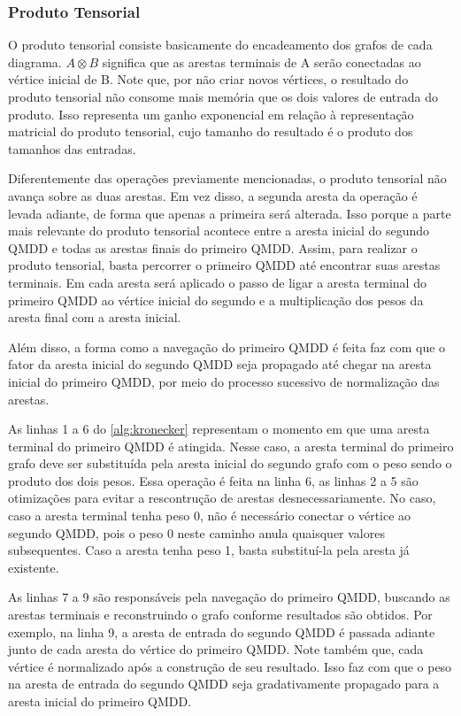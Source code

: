 \subsubsection{Produto Tensorial}\label{subsub:kronecker}

O produto tensorial consiste basicamente do encadeamento dos grafos de cada diagrama. $A \otimes B$ significa que as arestas terminais de A serão conectadas ao vértice inicial de B. Note que, por não criar novos vértices, o resultado do produto tensorial não consome mais memória que os dois valores de entrada do produto. Isso representa um ganho exponencial em relação à representação matricial do produto tensorial, cujo tamanho do resultado é o produto dos tamanhos das entradas.

Diferentemente das operações previamente mencionadas, o produto tensorial não avança sobre as duas arestas. Em vez disso, a segunda aresta da operação é levada adiante, de forma que apenas a primeira será alterada. Isso porque a parte mais relevante do produto tensorial acontece entre a aresta inicial do segundo QMDD e todas as arestas finais do primeiro QMDD. Assim, para realizar o produto tensorial, basta percorrer o primeiro QMDD até encontrar suas arestas terminais. Em cada aresta será aplicado o passo de ligar a aresta terminal do primeiro QMDD ao vértice inicial do segundo e a multiplicação dos pesos da aresta final com a aresta inicial.

Além disso, a forma como a navegação do primeiro QMDD é feita faz com que o fator da aresta inicial do segundo QMDD seja propagado até chegar na aresta inicial do primeiro QMDD, por meio do processo sucessivo de normalização das arestas.

As linhas 1 a 6 do \cref{alg:kronecker} representam o momento em que uma aresta terminal do primeiro QMDD é atingida. Nesse caso, a aresta terminal do primeiro grafo deve ser substituída pela aresta inicial do segundo grafo com o peso sendo o produto dos dois pesos. Essa operação é feita na linha 6, as linhas 2 a 5 são otimizações para evitar a rescontrução de arestas desnecessariamente. No caso, caso a aresta terminal tenha peso 0, não é necessário conectar o vértice ao segundo QMDD, pois o peso 0 neste caminho anula quaisquer valores subsequentes. Caso a aresta tenha peso 1, basta substituí-la pela aresta já existente.

As linhas 7 a 9 são responsáveis pela navegação do primeiro QMDD, buscando as arestas terminais e reconstruindo o grafo conforme resultados são obtidos. Por exemplo, na linha 9, a aresta de entrada do segundo QMDD é passada adiante junto de cada aresta do vértice do primeiro QMDD. Note também que, cada vértice é normalizado após a construção de seu resultado. Isso faz com que o peso na aresta de entrada do segundo QMDD seja gradativamente propagado para a aresta inicial do primeiro QMDD.

